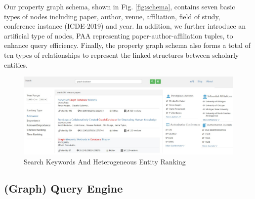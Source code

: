 Our property graph schema, shown in Fig. \ref{fig:schema}, contains seven basic types of nodes including paper, author, venue, affiliation, field of study, conference instance (\eg ICDE-2019) and year. In addition, we further introduce an artificial type of nodes, \ie PAA representing paper-author-affiliation tuples, to enhance query efficiency. Finally, the property graph schema also forms a total of ten types of relationships to represent the linked structures between scholarly entities.







\begin{figure}[tp]
\centering
\includegraphics[width=\textwidth]{searchKeywords.pdf}
\caption{Search Keywords And Heterogeneous Entity Ranking}
\label{fig: search keywords}
\vspace{-3ex}
\end{figure}

\subsection{(Graph) Query Engine}


